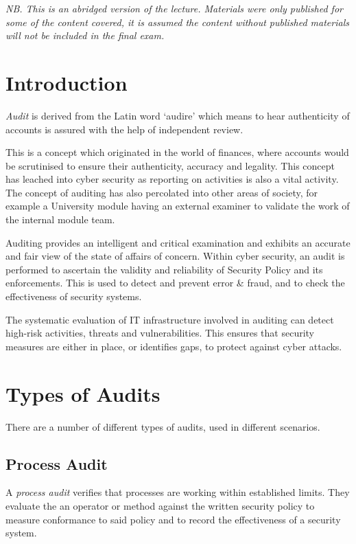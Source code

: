
\textit{NB. This is an abridged version of the lecture. Materials were only published for some of the content covered, it is assumed the content without published materials will not be included in the final exam.}

\section{Introduction}
\textit{Audit} is derived from the Latin word `audire' which means to hear authenticity of accounts is assured with the help of independent review. 

This is a concept which originated in the world of finances, where accounts would be scrutinised to ensure their authenticity, accuracy and legality. This concept has leached into cyber security as reporting on activities is also a vital activity. The concept of auditing has also percolated into other areas of society, for example a University module having an external examiner to validate the work of the internal module team.

Auditing provides an intelligent and critical examination and exhibits an accurate and fair view of the state of affairs of concern. Within cyber security, an audit is performed to ascertain the validity and reliability of Security Policy and its enforcements. This is used to detect and prevent error \& fraud, and to check the effectiveness of security systems.

The systematic evaluation of IT infrastructure involved in auditing can detect high-risk activities, threats and vulnerabilities. This ensures that security measures are either in place, or identifies gaps, to protect against cyber attacks. 

\section{Types of Audits}
There are a number of different types of audits, used in different scenarios.

\subsection{Process Audit}
A \textit{process audit} verifies that processes are working within established limits. They evaluate the an operator or method against the written security policy to measure conformance to said policy and to record the effectiveness of a security system. 

